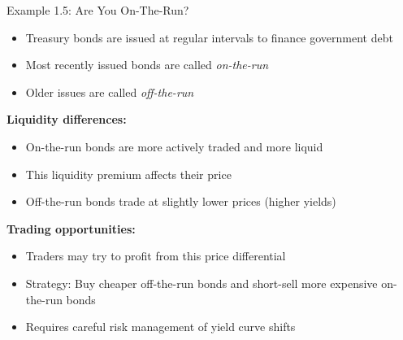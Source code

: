 \documentclass[10pt,handout]{beamer}
\begin{document}
\begin{frame}{Example 1.5: Are You On-The-Run?}
  \begin{itemize}
    \item Treasury bonds are issued at regular intervals to finance government debt
    \item Most recently issued bonds are called \textit{on-the-run}
    \item Older issues are called \textit{off-the-run}
  \end{itemize}
  
  \pause
  \textbf{Liquidity differences:}
  \begin{itemize}
    \item On-the-run bonds are more actively traded and more liquid
    \item This liquidity premium affects their price
    \item Off-the-run bonds trade at slightly lower prices (higher yields)
  \end{itemize}
  
  \pause
  \textbf{Trading opportunities:}
  \begin{itemize}
    \item Traders may try to profit from this price differential
    \item Strategy: Buy cheaper off-the-run bonds and short-sell more expensive on-the-run bonds
    \item Requires careful risk management of yield curve shifts
  \end{itemize}
\end{frame}
\end{document}
